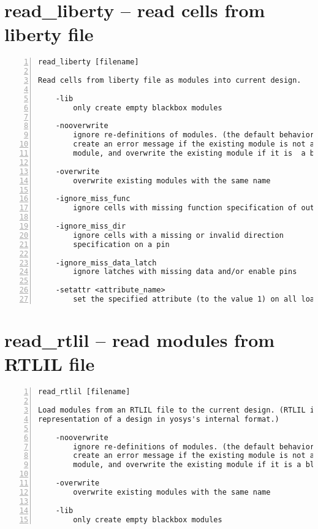 \section{read\_liberty -- read cells from liberty file}
\label{cmd:read_liberty}
\begin{lstlisting}[numbers=left,frame=single]
    read_liberty [filename]

Read cells from liberty file as modules into current design.

    -lib
        only create empty blackbox modules

    -nooverwrite
        ignore re-definitions of modules. (the default behavior is to
        create an error message if the existing module is not a blackbox
        module, and overwrite the existing module if it is  a blackbox module.)

    -overwrite
        overwrite existing modules with the same name

    -ignore_miss_func
        ignore cells with missing function specification of outputs

    -ignore_miss_dir
        ignore cells with a missing or invalid direction
        specification on a pin

    -ignore_miss_data_latch
        ignore latches with missing data and/or enable pins

    -setattr <attribute_name>
        set the specified attribute (to the value 1) on all loaded modules
\end{lstlisting}

\section{read\_rtlil -- read modules from RTLIL file}
\label{cmd:read_rtlil}
\begin{lstlisting}[numbers=left,frame=single]
    read_rtlil [filename]

Load modules from an RTLIL file to the current design. (RTLIL is a text
representation of a design in yosys's internal format.)

    -nooverwrite
        ignore re-definitions of modules. (the default behavior is to
        create an error message if the existing module is not a blackbox
        module, and overwrite the existing module if it is a blackbox module.)

    -overwrite
        overwrite existing modules with the same name

    -lib
        only create empty blackbox modules
\end{lstlisting}


